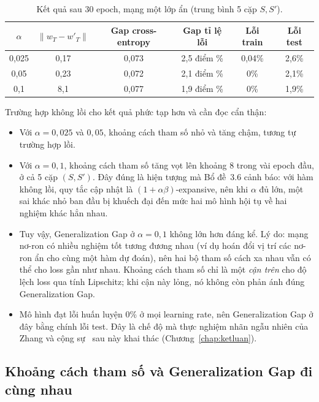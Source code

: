 \begin{table}[H]
\centering
\caption{Kết quả sau 30 epoch, mạng một lớp ẩn (trung bình 5 cặp $S, S'$).}
\label{tab:exp-nonconvex}
\begin{tabular}{|c|c|c|c|c|c|}
\hline
$\alpha$ & $\|w_T - w'_T\|$ & Gap cross-entropy & Gap tỉ lệ lỗi & Lỗi train & Lỗi test \\ \hline
0,025 & 0,17 & 0,073 & 2,5 điểm \% & 0,04\% & 2,6\% \\ \hline
0,05 & 0,23 & 0,072 & 2,1 điểm \% & 0\% & 2,1\% \\ \hline
0,1 & 8,1 & 0,077 & 1,9 điểm \% & 0\% & 1,9\% \\ \hline
\end{tabular}
\end{table}

Trường hợp không lồi cho kết quả phức tạp hơn và cần đọc cẩn thận:
\begin{itemize}
    \item Với $\alpha = 0{,}025$ và $0{,}05$, khoảng cách tham số nhỏ và tăng chậm, tương tự trường hợp lồi.
    \item Với $\alpha = 0{,}1$, khoảng cách tham số tăng vọt lên khoảng 8 trong vài epoch đầu, ở cả 5 cặp $(S, S')$. Đây đúng là hiện tượng mà Bổ đề~3.6 cảnh báo: với hàm không lồi, quy tắc cập nhật là $(1 + \alpha\beta)$-expansive, nên khi $\alpha$ đủ lớn, một sai khác nhỏ ban đầu bị khuếch đại đến mức hai mô hình hội tụ về hai nghiệm khác hẳn nhau.
    \item Tuy vậy, Generalization Gap ở $\alpha = 0{,}1$ không lớn hơn đáng kể. Lý do: mạng nơ-ron có nhiều nghiệm tốt tương đương nhau (ví dụ hoán đổi vị trí các nơ-ron ẩn cho cùng một hàm dự đoán), nên hai bộ tham số cách xa nhau vẫn có thể cho loss gần như nhau. Khoảng cách tham số chỉ là một \emph{cận trên} cho độ lệch loss qua tính Lipschitz; khi cận này lỏng, nó không còn phản ánh đúng Generalization Gap.
    \item Mô hình đạt lỗi huấn luyện 0\% ở mọi learning rate, nên Generalization Gap ở đây bằng chính lỗi test. Đây là chế độ mà thực nghiệm nhãn ngẫu nhiên của Zhang và cộng sự~\cite{zhang2017understanding} sau này khai thác (Chương~\ref{chap:ketluan}).
\end{itemize}

\subsection{Khoảng cách tham số và Generalization Gap đi cùng nhau}


